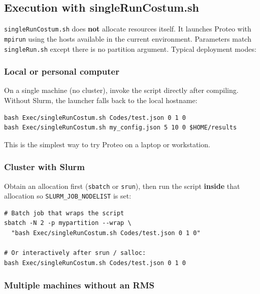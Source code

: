 \subsection{Execution with singleRunCostum.sh}
\label{subsection:single-run-costum}

\texttt{singleRunCostum.sh} does \textbf{not} allocate resources itself. It launches Proteo with \texttt{mpirun} using the hosts available in the current environment. Parameters match \texttt{singleRun.sh} except there is no partition argument. Typical deployment modes:

\subsubsection{Local or personal computer}

On a single machine (no cluster), invoke the script directly after compiling. Without Slurm, the launcher falls back to the local hostname:

\begin{lstlisting}[style=bashstyle,caption={Local run without Slurm.},captionpos=b]
bash Exec/singleRunCostum.sh Codes/test.json 0 1 0
bash Exec/singleRunCostum.sh my_config.json 5 10 0 $HOME/results
\end{lstlisting}

This is the simplest way to try Proteo on a laptop or workstation.

\subsubsection{Cluster with Slurm}

Obtain an allocation first (\texttt{sbatch} or \texttt{srun}), then run the script \textbf{inside} that allocation so \texttt{SLURM\_JOB\_NODELIST} is set:

\begin{lstlisting}[style=bashstyle,caption={singleRunCostum.sh inside a Slurm allocation.},captionpos=b]
# Batch job that wraps the script
sbatch -N 2 -p mypartition --wrap \
  "bash Exec/singleRunCostum.sh Codes/test.json 0 1 0"

# Or interactively after srun / salloc:
bash Exec/singleRunCostum.sh Codes/test.json 0 1 0
\end{lstlisting}

\subsubsection{Multiple machines without an RMS}

